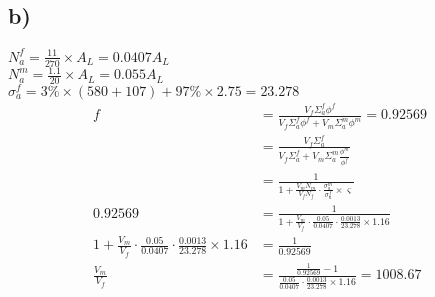 \documentclass{article}
\begin{document}
\subsection*{b)}

\(N_a^f=\displaystyle \frac{11}{270}\times A_L=0.0407A_L\)\\
\(N_a^m=\displaystyle \frac{1.1}{20}\times A_L=0.055 A_L\)\\
\(\sigma_a^f=3\%\times (580+107)+97\%\times 2.75=23.278\)\\
\begin{align*}
f&=\frac{V_f \Sigma_a^f \phi^f}{V_f \Sigma_a^f \phi^f + V_m \Sigma^m_a\phi^m}=0.92569\\
&=\frac{V_f \Sigma_a^f}{V_f \Sigma_a^f+ V_m \Sigma^m_a\frac{\phi^m}{\phi^f}}\\
&=\frac{1}{1+\frac{V_mN_m}{V_fN_f}\cdot\frac{\sigma_a^m}{\sigma_a^f}\times \varsigma }\\
0.92569&=\frac{1}{1+\frac{V_m}{V_f}\cdot \frac{0.05}{0.0407}\cdot \frac{0.0013}{23.278}\times 1.16}\\
1+\frac{V_m}{V_f}\cdot \frac{0.05}{0.0407}\cdot \frac{0.0013}{23.278}\times 1.16&=\frac{1}{0.92569}\\
\frac{V_m}{V_f} &=\frac{\frac{1}{0.92569}-1}{\frac{0.05}{0.0407}\cdot \frac{0.0013}{23.278}\times 1.16}=1008.67
\end{align*}
\end{document}
